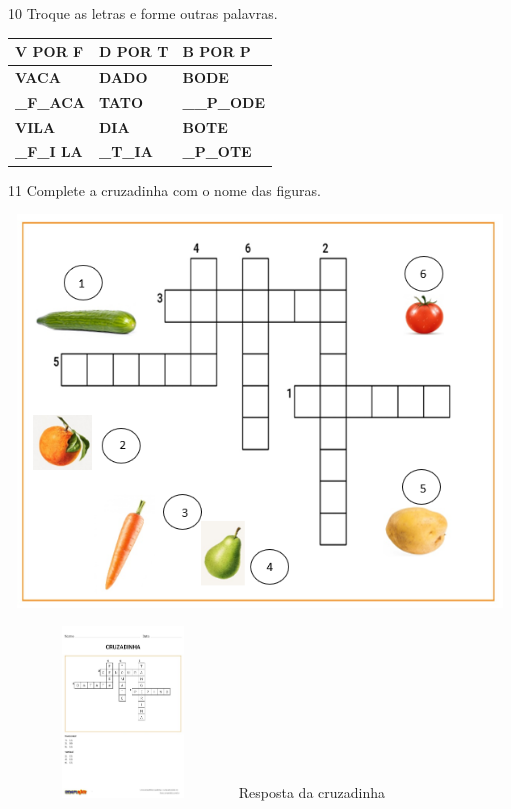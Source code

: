 {\num{10} Troque as letras e forme outras palavras.


\begin{longtable}[]{@{}lll@{}}
\toprule
\textbf{V POR F} & \textbf{D POR T} & \textbf{B POR P}\tabularnewline
\midrule
\endhead
\textbf{VACA} & \textbf{DADO} & \textbf{BODE}\tabularnewline
\textbf{\_F\_ACA} & \textbf{TATO} & \textbf{\_\_P\_ODE}\tabularnewline
\textbf{VILA} & \textbf{DIA} & \textbf{BOTE}\tabularnewline
\textbf{\_F\_I LA} & \textbf{\_T\_IA} & \textbf{\_P\_OTE}\tabularnewline
\bottomrule
\end{longtable}

\num{11} Complete a cruzadinha com o nome das figuras.


\includegraphics[width=5.69167in,height=4.10139in]{media/image40.png}

\includegraphics[width=2.40385in,height=1.79075in]{media/image41.jpeg}Resposta
da cruzadinha

}
